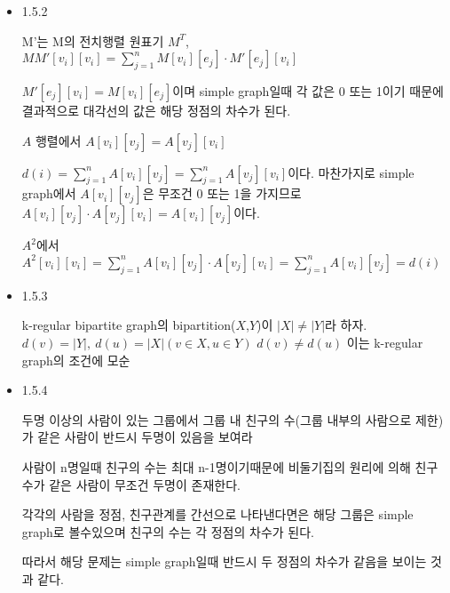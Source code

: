 \documentclass{oblivoir}
\newtheorem{corollary}{Corollary}[theorem]
\begin{document}
\begin{itemize}
    \begin{corollary}
        어떤 그래프의 차수가 홀수인 정점의 갯수는 짝수이다.
    \end{corollary}

    \begin{proof}
        차수가 홀수와 짝수인 $V_1$, $V_2$로 정점을 나누었을 때,
        \[
            \sum_{v \in V_1} d(v) + \sum_{v \in V_2} d(v) = \sum_{v \in V_} d(v)
        \]
        는 짝수이다. $\sum_{v \in V_2} d(v)$는 짝수이므로 $\sum_{v \in V_1} d(v)$ 또한 짝수이다. 그러므로 $|V_1|$은 짝수이다.
    \end{proof}

    \item 1.5.2

    M'는 M의 전치행렬 원표기 $M^{T}$,
    $MM'[v_i][v_i] = \sum_{j=1}^n M[v_i][e_j] \cdot M'[e_j][v_i]$

    $ M'[e_j][v_i] = M[v_i][e_j] $이며 simple graph일때 각 값은 0 또는 1이기 때문에 결과적으로 대각선의 값은 해당 정점의 차수가 된다.

    $A$ 행렬에서 $A[v_i][v_j] = A[v_j][v_i]$ 

    $d(i) = \sum_{j=1}^n A[v_i][v_j] = \sum_{j=1}^n A[v_j][v_i]$이다.
    마찬가지로 simple graph에서 $A[v_i][v_j]$은 무조건 0 또는 1을 가지므로 $A[v_i][v_j] \cdot A[v_j][v_i] = A[v_i][v_j]$이다.

    $A^2$에서 $A^2[v_i][v_i] = \sum_{j=1}^n A[v_i][v_j] \cdot A[v_j][v_i]= \sum_{j=1}^n A[v_i][v_j] = d(i)$

    \item 1.5.3
    
    k-regular bipartite graph의 bipartition($X$,$Y$)이 $|X|\neq |Y|$라 하자. $d(v)=|Y|,\: d(u)=|X|(v \in X, u \in Y )$ $d(v) \neq d(u)$ 이는 k-regular graph의 조건에 모순

    \item 1.5.4

    두명 이상의 사람이 있는 그룹에서 그룹 내 친구의 수(그룹 내부의 사람으로 제한)가 같은 사람이 반드시 두명이 있음을 보여라

    사람이 n명일때 친구의 수는 최대 n-1명이기때문에 비둘기집의 원리에 의해 친구 수가 같은 사람이 무조건 두명이 존재한다.

    각각의 사람을 정점, 친구관계를 간선으로 나타낸다면은 해당 그룹은 simple graph로 볼수있으며 친구의 수는 각 정점의 차수가 된다.

    따라서 해당 문제는 simple graph일때 반드시 두 정점의 차수가 같음을 보이는 것과 같다. 


\end{itemize}
\end{document}
